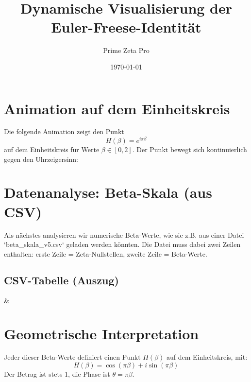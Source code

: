 \documentclass[12pt]{article}
\title{Dynamische Visualisierung der Euler-Freese-Identität}
\author{Prime Zeta Pro}
\date{\today}
\begin{document}
\maketitle

\section*{Animation auf dem Einheitskreis}

Die folgende Animation zeigt den Punkt 
\[
H(\beta) = e^{i\pi\beta}
\]
auf dem Einheitskreis für Werte $\beta \in [0,2]$. Der Punkt bewegt sich kontinuierlich gegen den Uhrzeigersinn:

\begin{center}
\begin{animateinline}[poster=first, controls, loop]{10}
\end{animateinline}
\end{center}

\section*{Datenanalyse: Beta-Skala (aus CSV)}

Als nächstes analysieren wir numerische Beta-Werte, wie sie z.B. aus einer Datei `beta_skala_v5.csv` geladen werden könnten. Die Datei muss dabei zwei Zeilen enthalten: erste Zeile = Zeta-Nullstellen, zweite Zeile = Beta-Werte.

\subsection*{CSV-Tabelle (Auszug)}

\begin{center}
{\zeta & \beta}
\end{center}

\section*{Geometrische Interpretation}

Jeder dieser Beta-Werte definiert einen Punkt $H(\beta)$ auf dem Einheitskreis, mit:
\[
H(\beta) = \cos(\pi \beta) + i\sin(\pi \beta)
\]
Der Betrag ist stets 1, die Phase ist $\theta = \pi \beta$.
\end{document}
